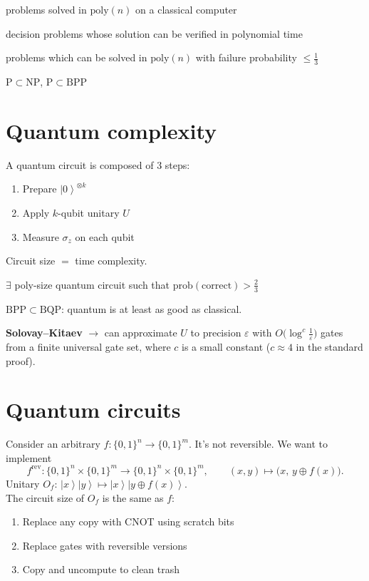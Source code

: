 \documentclass[11pt,a4paper]{article}
\renewcommand{\ket}[1]{\left|#1\right\rangle}
\begin{document}
\begin{description}[leftmargin=!,labelwidth=3.2em]
  \item[P:] problems solved in $\mathrm{poly}(n)$ on a classical computer
  \item[NP:] decision problems whose solution can be verified in polynomial time
  \item[BPP:] problems which can be solved in $\mathrm{poly}(n)$ with failure probability $\le\frac13$
\end{description}
$\mathrm{P}\subset\mathrm{NP}$, \quad $\mathrm{P}\subset\mathrm{BPP}$

\section{Quantum complexity}

A quantum circuit is composed of 3 steps:
\begin{enumerate}
  \item Prepare $\ket{0}^{\otimes k}$
  \item Apply $k$-qubit unitary $U$
  \item Measure $\sigma_z$ on each qubit
\end{enumerate}
Circuit size $=$ time complexity.

\begin{description}[leftmargin=!,labelwidth=3.2em]
  \item[BQP:] $\exists$ poly-size quantum circuit such that $\mathrm{prob}(\text{correct}) > \frac23$
\end{description}
$\mathrm{BPP}\subset\mathrm{BQP}$: quantum is at least as good as classical.

\textbf{Solovay--Kitaev} $\to$ can approximate $U$ to precision $\varepsilon$ with $O\bigl(\log^c\frac1\varepsilon\bigr)$ gates from a finite universal gate set, where $c$ is a small constant ($c\approx4$ in the standard proof).

\section{Quantum circuits}

Consider an arbitrary $f:\{0,1\}^n\to\{0,1\}^m$. It's not reversible. We want to implement
\[
f^{\mathrm{rev}}:\{0,1\}^n\times\{0,1\}^m \to \{0,1\}^n\times\{0,1\}^m,\qquad (x,y)\mapsto\bigl(x,\,y\oplus f(x)\bigr).
\]
Unitary $O_f$: $\ket{x}\ket{y}\mapsto\ket{x}\ket{y\oplus f(x)}$.\\
The circuit size of $O_f$ is the same as $f$:
\begin{enumerate}
  \item Replace any copy with CNOT using scratch bits
  \item Replace gates with reversible versions
  \item Copy and uncompute to clean trash
\end{enumerate}
\end{document}
